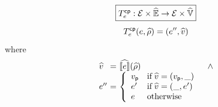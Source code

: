 \[
  \framebox{$\cptransforme: \exprset \times \aenvset \rightarrow \exprset \times
  \avalset$}
\]
\[
  T^{\textsf{cp}}_e(e, \widehat{\rho}) = (e'', \widehat{v})
\]
where
\[
  \begin{array}{l@{~}c@{~}ll}
    \aval &=& \asem{\expr}(\aenv) &\wedge\\
    \expr'' &=& \left\{
      \begin{array}{ll}
        \pval & \text{if} \; \aval = (\pval, \_)\\
        \expr' & \text{if} \; \aval = (\_, \expr')\\
        \expr & \text{otherwise}\\
      \end{array}
    \right.\\
  \end{array}
\]

